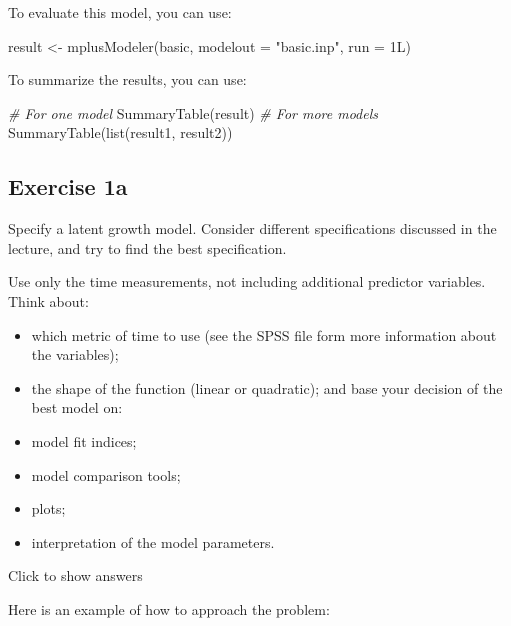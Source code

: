 \documentclass[
]{book}
\newenvironment{Shaded}{\begin{snugshade}}{\end{snugshade}}
\newcommand{\AttributeTok}[1]{\textcolor[rgb]{0.77,0.63,0.00}{#1}}
\newcommand{\CommentTok}[1]{\textcolor[rgb]{0.56,0.35,0.01}{\textit{#1}}}
\newcommand{\FunctionTok}[1]{\textcolor[rgb]{0.00,0.00,0.00}{#1}}
\newcommand{\NormalTok}[1]{#1}
\newcommand{\OtherTok}[1]{\textcolor[rgb]{0.56,0.35,0.01}{#1}}
\newcommand{\StringTok}[1]{\textcolor[rgb]{0.31,0.60,0.02}{#1}}
\providecommand{\tightlist}{%
  \setlength{\itemsep}{0pt}\setlength{\parskip}{0pt}}
\begin{document}
To evaluate this model, you can use:

\begin{Shaded}
\begin{Highlighting}[]
\NormalTok{result }\OtherTok{\textless{}{-}} \FunctionTok{mplusModeler}\NormalTok{(basic, }\AttributeTok{modelout =} \StringTok{"basic.inp"}\NormalTok{, }\AttributeTok{run =}\NormalTok{ 1L)}
\end{Highlighting}
\end{Shaded}

To summarize the results, you can use:

\begin{Shaded}
\begin{Highlighting}[]
\CommentTok{\# For one model}
\FunctionTok{SummaryTable}\NormalTok{(result)}
\CommentTok{\# For more models}
\FunctionTok{SummaryTable}\NormalTok{(}\FunctionTok{list}\NormalTok{(result1, result2))}
\end{Highlighting}
\end{Shaded}

\hypertarget{exercise-1a}{%
\subsection{Exercise 1a}\label{exercise-1a}}

Specify a latent growth model. Consider different specifications discussed in the lecture, and try to find the best specification.

Use only the time measurements, not including additional
predictor variables.\\
Think about:

\begin{itemize}
\tightlist
\item
  which metric of time to use (see the SPSS file form more information about the variables);
\item
  the shape of the function (linear or quadratic);
  and base your decision of the best model on:\\
\item
  model fit indices;
\item
  model comparison tools;
\item
  plots;
\item
  interpretation of the model parameters.
\end{itemize}

Click to show answers

Here is an example of how to approach the problem:
\end{document}
